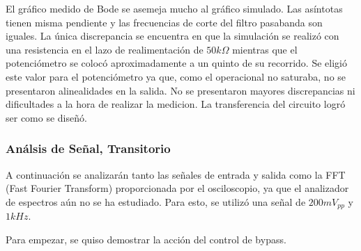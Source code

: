El gráfico medido de Bode se asemeja mucho al gráfico simulado. Las asíntotas tienen misma pendiente y las frecuencias de corte del filtro pasabanda son iguales. La única discrepancia se encuentra en que la simulación se realizó con una resistencia en el lazo de realimentación de $50k\Omega$ mientras que el potenciómetro se colocó aproximadamente a un quinto de su recorrido. Se eligió este valor para el potenciómetro ya que, como el operacional no saturaba, no se presentaron alinealidades en la salida. No se presentaron mayores discrepancias ni dificultades a la hora de realizar la medicion. La transferencia del circuito logró ser como se diseñó.

\subsubsection{Análsis de Señal, Transitorio}

A continuación se analizarán tanto las señales de entrada y salida como la FFT (Fast Fourier Transform) proporcionada por el osciloscopio, ya que el analizador de espectros aún no se ha estudiado. Para esto, se utilizó una señal de $200mV_{pp}$ y $1kHz$.

Para empezar, se quiso demostrar la acción del control de bypass.

